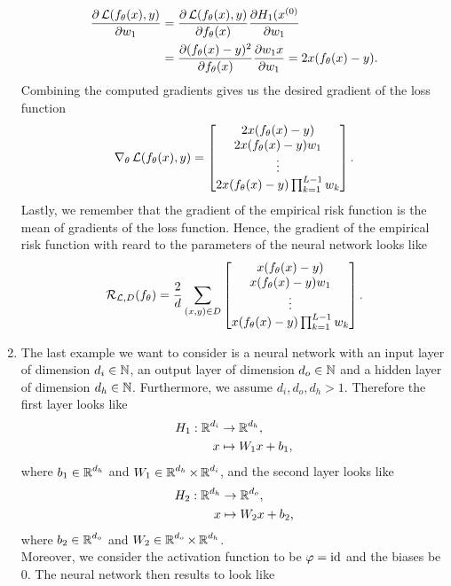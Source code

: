 \begin{example}
\begin{enumerate}
\begin{align*}
\frac{\partial \operatorname{\mathcal{L}} (f_{\theta}(x), y)}{ \partial w_1} &= \frac{\partial \operatorname{\mathcal{L}} (f_{\theta}(x), y)}{\partial f_{\theta}(x)} \frac{\partial H_1(x^{(0)}}{ \partial w_1}\\
&= \frac{\partial  (f_{\theta}(x) - y)^2}{\partial f_{\theta}(x)} \frac{\partial w_1x}{ \partial w_1} = 2x (f_{\theta}(x) - y).
\end{align*}
Combining the computed gradients gives us the desired gradient of the loss function
\begin{align*}
\nabla_\theta \operatorname{\mathcal{L}} (f_{\theta}(x), y) = \left[\begin{matrix}
2x (f_{\theta}(x) - y)\\
2x (f_{\theta}(x) - y) w_1\\
\vdots\\
2x (f_{\theta}(x) - y) \prod_{k=1}^{L-1} w_k
\end{matrix} \right].
\end{align*}
Lastly, we remember that the gradient of the empirical risk function is the mean of gradients of the loss function. Hence, the gradient of the empirical risk function with reard to the parameters of the neural network looks like
\begin{align*}
\operatorname{\mathcal{R}}_{\operatorname{\mathcal{L}}, D} (f_{\theta}) = \frac{2}{d} \sum_{(x, y)\in D} \left[\begin{matrix}
x (f_{\theta}(x) - y)\\
x (f_{\theta}(x) - y) w_1\\
\vdots\\
x (f_{\theta}(x) - y) \prod_{k=1}^{L-1} w_k
\end{matrix} \right].
\end{align*}
\iffalse
\item The last example we want to consider is a neural network with an input layer of dimension $d_i\in\operatorname{\mathbb{N}}$, an output layer of dimension $d_o\in\operatorname{\mathbb{N}}$ and a hidden layer of dimension  $d_h\in\operatorname{\mathbb{N}}$. Furthermore, we assume $d_i, d_o, d_h > 1$. Therefore the first layer looks like
\begin{align*}
H_1: \operatorname{\mathbb{R}}^{d_i} &\to \operatorname{\mathbb{R}}^{d_h},\\
x &\mapsto W_1x + b_1,
\end{align*}
where $b_1\in\operatorname{\mathbb{R}}^{d_h}$ and $W_1\in\operatorname{\mathbb{R}}^{d_h}\times\operatorname{\mathbb{R}}^{d_i}$, and the second layer looks like
\begin{align*}
H_2: \operatorname{\mathbb{R}}^{d_h} &\to \operatorname{\mathbb{R}}^{d_o},\\
x &\mapsto W_2x + b_2,
\end{align*}
where $b_2\in\operatorname{\mathbb{R}}^{d_o}$ and $W_2\in\operatorname{\mathbb{R}}^{d_o}\times\operatorname{\mathbb{R}}^{d_h}$.\\
Moreover, we consider the activation function to be $\operatorname{\varphi}=\mathrm{id}$ and the biases be $0$. The neural network then results to look like

\end{enumerate}
\end{example}
